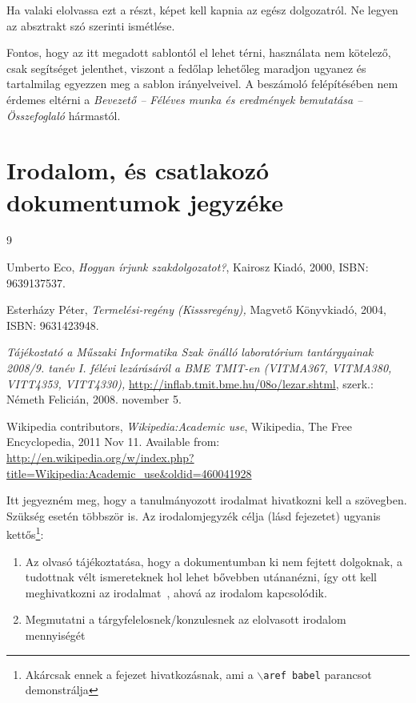 \documentclass[a4paper,oneside]{article}
\begin{document}
Ha valaki elolvassa ezt a részt, képet kell kapnia az egész
dolgozatról.  Ne legyen az absztrakt szó szerinti ismétlése.

Fontos, hogy az itt megadott sablontól el lehet térni, használata nem
kötelező, csak segítséget jelenthet, viszont a fedőlap lehetőleg
maradjon ugyanez és tartalmilag egyezzen meg a sablon irányelveivel. A
beszámoló felépítésében nem érdemes eltérni a \emph{Bevezető --
  Féléves munka és eredmények bemutatása -- Összefoglaló} hármastól.

\newpage

\section{Irodalom, és csatlakozó dokumentumok jegyzéke}
\label{sec:irod-es-csatl}

\begin{thebibliography}{9}
  \label{sec:tanulm-irod-jegyz}

   Umberto Eco, \emph{Hogyan írjunk szakdolgozatot?},
  Kairosz Kiadó, 2000, ISBN: 9639137537.

   Esterházy Péter, \emph{Termelési-regény (Kisssregény),}
  Magvető Könyvkiadó, 2004, ISBN: 9631423948.

   \emph{Tájékoztató a Műszaki Informatika Szak önálló
    laboratórium tantárgyainak 2008/9. tanév I. félévi lezárásáról a
    BME TMIT-en (VITMA367, VITMA380, VITT4353, VITT4330),}
  \url{http://inflab.tmit.bme.hu/08o/lezar.shtml}, szerk.: Németh Felicián,
  2008. november 5.

   Wikipedia contributors, \emph{Wikipedia:Academic
    use}, Wikipedia, The Free Encyclopedia, 2011 Nov 11.  Available
  from: \\ \url{http://en.wikipedia.org/w/index.php?title=Wikipedia:Academic\_use\&oldid=460041928}

\end{thebibliography}

Itt jegyezném meg, hogy a tanulmányozott irodalmat hivatkozni kell a
szövegben.  Szükség esetén többször is.  Az irodalomjegyzék célja
(lásd  fejezetet) ugyanis
kettős\footnote{Akárcsak ennek a fejezet hivatkozásnak, ami a
  \texttt{$\backslash$aref babel} parancsot demonstrálja}:
\begin{enumerate}
  \item Az olvasó tájékoztatása, hogy a dokumentumban ki nem fejtett
        dolgoknak, a tudottnak vélt ismereteknek hol lehet bővebben
        utánanézni, így ott kell meghivatkozni az irodalmat~\cite{eco,
          esterhazy}, ahová az irodalom kapcsolódik.
  \item Megmutatni a tárgyfelelosnek/konzulesnek az elolvasott irodalom
        mennyiségét
\end{enumerate}
\end{document}
